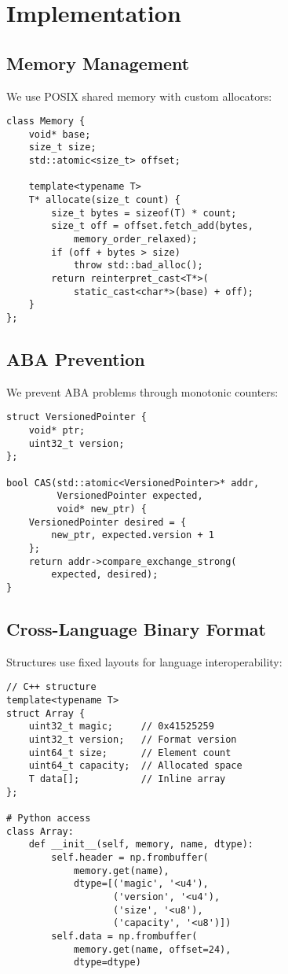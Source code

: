 \documentclass[sigconf,review,anonymous]{acmart}
\begin{document}
\section{Implementation}

\subsection{Memory Management}

We use POSIX shared memory with custom allocators:

\begin{lstlisting}
class Memory {
    void* base;
    size_t size;
    std::atomic<size_t> offset;
    
    template<typename T>
    T* allocate(size_t count) {
        size_t bytes = sizeof(T) * count;
        size_t off = offset.fetch_add(bytes,
            memory_order_relaxed);
        if (off + bytes > size) 
            throw std::bad_alloc();
        return reinterpret_cast<T*>(
            static_cast<char*>(base) + off);
    }
};
\end{lstlisting}

\subsection{ABA Prevention}

We prevent ABA problems through monotonic counters:

\begin{lstlisting}
struct VersionedPointer {
    void* ptr;
    uint32_t version;
};

bool CAS(std::atomic<VersionedPointer>* addr,
         VersionedPointer expected,
         void* new_ptr) {
    VersionedPointer desired = {
        new_ptr, expected.version + 1
    };
    return addr->compare_exchange_strong(
        expected, desired);
}
\end{lstlisting}

\subsection{Cross-Language Binary Format}

Structures use fixed layouts for language interoperability:

\begin{lstlisting}
// C++ structure
template<typename T>
struct Array {
    uint32_t magic;     // 0x41525259
    uint32_t version;   // Format version
    uint64_t size;      // Element count
    uint64_t capacity;  // Allocated space
    T data[];           // Inline array
};

# Python access
class Array:
    def __init__(self, memory, name, dtype):
        self.header = np.frombuffer(
            memory.get(name),
            dtype=[('magic', '<u4'),
                   ('version', '<u4'),
                   ('size', '<u8'),
                   ('capacity', '<u8')])
        self.data = np.frombuffer(
            memory.get(name, offset=24),
            dtype=dtype)
\end{lstlisting}
\end{document}
